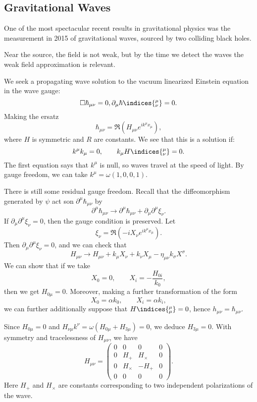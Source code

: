 \documentclass[12pt]{article}
\begin{document}
\subsection{Gravitational Waves}%
\label{sub:gws}

One of the most spectacular recent results in gravitational physics was the measurement in 2015 of gravitational waves, sourced by two colliding black holes.

Near the source, the field is not weak, but by the time we detect the waves the weak field approximation is relevant.


We seek a propagating wave solution to the vacuum linearized Einstein equation in the wave gauge:
\[
\square \hbar_{\mu\nu} = 0, \partial_\mu \hbar\indices{^{\mu}_{\nu}}= 0.
\]
Making the ersatz
\[
\hbar_{\mu\nu} = \Re \left( H_{\mu\nu} e^{ik^\mu x_\mu} \right),
\]
where $H$ is symmetric and $R$ are constants. We see that this is a solution if:
\[
	k^\mu k_\mu = 0, \qquad k_\mu H\indices{^{\mu}_{\nu}} = 0.
\]
The first equation says that $k^\mu$ is null, so waves travel at the speed of light. By gauge freedom, we can take $k^\mu = \omega(1, 0, 0, 1)$.

There is still some residual gauge freedom. Recall that the diffeomorphism generated by $\psi$ act son $\partial^\mu \hbar_{\mu\nu}$ by
\[
\partial^{\mu} \hbar_{\mu\nu} \to \partial^{\mu} \hbar_{\mu\nu} + \partial_\mu \partial^\mu \xi_\nu.
\]
If $\partial_\mu \partial^{\mu} \xi_\nu = 0$, then the gauge condition is preserved. Let
\[
\xi_\nu = \Re (-i X_\nu e^{ik ^\mu x_\mu} ).
\]
Then $\partial_\mu \partial^\mu \xi_\nu = 0$, and we can check that
\[
H_{\mu\nu} \to H_{\mu\nu} + k_\mu X_\nu  + k_\nu X_\mu - \eta_{\mu\nu} k_\sigma X^\sigma.
\]
We can show that if we take
\[
X_0 = 0, \qquad X_i = - \frac{H_{0i}}{k_0},
\]
then we get $H_{0\mu} = 0$. Moreover, making a further transformation of the form
\[
X_0 = \alpha k_0, \qquad X_i = \alpha k_i,
\]
we can further additionally suppose that $H\indices{_{\mu}^\mu} = 0$, hence $h_{\mu\nu} = \hbar_{\mu\nu}$.

Since $H_{0\mu} = 0$ and $H_{\nu\mu} k^\nu = \omega(H_{0\mu} + H_{3\mu}) = 0$, we deduce $H_{3\mu} = 0$. With symmetry and tracelessness of $H_{\mu\nu}$, we have
\[
H_{\mu\nu} =
\begin{pmatrix}
	0 & 0 & 0 & 0 \\
	0 & H_+ & H_\times & 0 \\
	0 & H_\times & -H_+ & 0 \\
	0 & 0 & 0 & 0
\end{pmatrix}.
\]
Here $H_+$ and $H_\times$ are constants corresponding to two independent polarizations of the wave.
\end{document}
